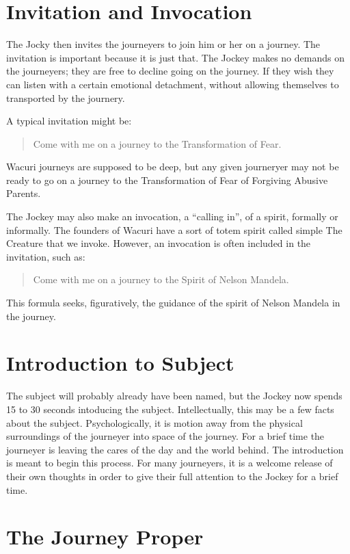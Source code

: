 \documentclass[12pt]{book}
\begin{document}
\section{ Invitation and Invocation}
The Jocky then invites the journeyers to join him or her on a journey.
The invitation is important because it is just that. The Jockey
makes no demands on the journeyers; they are free to decline going on the
journey. If they wish they can listen with a certain emotional detachment,
without allowing themselves to transported by the journery.

A typical invitation might be:
\begin{quote}
  Come with me on a journey to the Transformation of Fear.
\end{quote}
Wacuri journeys are supposed to be deep, but any given journeryer
may not be ready to go on a journey to the Transformation of Fear
of Forgiving Abusive Parents.

The Jockey may also make an invocation, a ``calling in'', of a spirit,
formally or informally. The founders of Wacuri have a sort of totem
spirit called simple The Creature that we invoke. However, an
invocation is often included in the invitation, such as:
\begin{quote}
  Come with me on a journey to the Spirit of Nelson Mandela.
\end{quote}
This formula seeks, figuratively, the guidance of the spirit of
Nelson Mandela in the journey.

\section{ Introduction to Subject}

The subject will probably already have been named, but the
Jockey now spends 15 to 30 seconds intoducing the subject. Intellectually,
this may be a few facts about the subject. Psychologically, it is
motion away from the physical surroundings of the journeyer into
space of the journey. For a brief time the journeyer is leaving
the cares of the day and the world behind. The introduction is
meant to begin this process. For many journeyers, it is a welcome
release of their own thoughts in order to give their full attention
to the Jockey for a brief time.

\section{ The Journey Proper}
\end{document}

